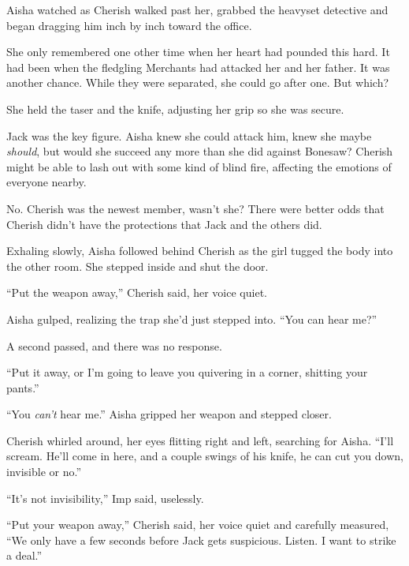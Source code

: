 Aisha watched as Cherish walked past her, grabbed the heavyset detective and began dragging him inch by inch toward the office.



She only remembered one other time when her heart had pounded this hard.  It had been when the fledgling Merchants had attacked her and her father.  It was another chance.  While they were separated, she could go after one.  But which?



She held the taser and the knife, adjusting her grip so she was secure.



Jack was the key figure.  Aisha knew she could attack him, knew she maybe \emph{should}, but would she succeed any more than she did against Bonesaw?  Cherish might be able to lash out with some kind of blind fire, affecting the emotions of everyone nearby.



No.  Cherish was the newest member, wasn't she?  There were better odds that Cherish didn't have the protections that Jack and the others did.



Exhaling slowly, Aisha followed behind Cherish as the girl tugged the body into the other room.  She stepped inside and shut the door.



``Put the weapon away,'' Cherish said, her voice quiet.



Aisha gulped, realizing the trap she'd just stepped into.  ``You can hear me?''



A second passed, and there was no response.



``Put it away, or I'm going to leave you quivering in a corner, shitting your pants.''



``You \emph{can't} hear me.''  Aisha gripped her weapon and stepped closer.



Cherish whirled around, her eyes flitting right and left, searching for Aisha.  ``I'll scream.  He'll come in here, and a couple swings of his knife, he can cut you down, invisible or no.''



``It's not invisibility,'' Imp said, uselessly.



``Put your weapon away,'' Cherish said, her voice quiet and carefully measured, ``We only have a few seconds before Jack gets suspicious.  Listen.  I want to strike a deal.''

